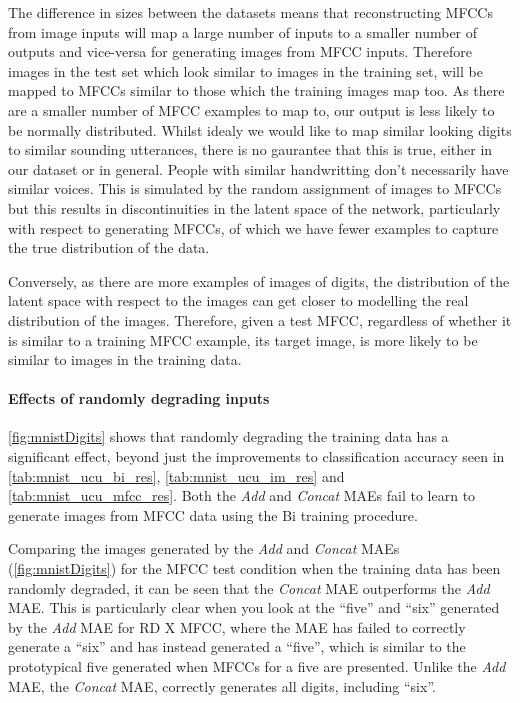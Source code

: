 The difference in sizes between the datasets means that reconstructing MFCCs from image inputs will map a large number of inputs to a smaller number of outputs and vice-versa for generating images from MFCC inputs. Therefore images in the test set which look similar to images in the training set, will be mapped to MFCCs similar to those which the training images map too. As there are a smaller number of MFCC examples to map to, our output is less likely to be normally distributed. Whilst idealy we would like to map similar looking digits to similar sounding utterances, there is no gaurantee that this is true, either in our dataset or in general. People with similar handwritting don't necessarily have similar voices. This is simulated by the random assignment of images to MFCCs but this results in discontinuities in the latent space of the network, particularly with respect to generating MFCCs, of which we have fewer examples to capture the true distribution of the data.

Conversely, as there are more examples of images of digits, the distribution of the latent space with respect to the images can get closer to modelling the real distribution of the images. Therefore, given a test MFCC, regardless of whether it is similar to a training MFCC example, its target image, is more likely to be similar to images in the training data.

\paragraph{Effects of randomly degrading inputs}
\autoref{fig:mnistDigits} shows that randomly degrading the training data has a significant effect, beyond just the improvements to classification accuracy seen in \autoref{tab:mnist_ucu_bi_res}, \autoref{tab:mnist_ucu_im_res} and \autoref{tab:mnist_ucu_mfcc_res}. Both the \textit{Add} and \textit{Concat} MAEs fail to learn to generate images from MFCC data using the Bi training procedure.

Comparing the images generated by the \textit{Add} and \textit{Concat} MAEs (\autoref{fig:mnistDigits}) for the MFCC test condition when the training data has been randomly degraded, it can be seen that the \textit{Concat} MAE outperforms the \textit{Add} MAE. This is particularly clear when you look at the ``five'' and ``six'' generated by the \textit{Add} MAE for RD X MFCC, where the MAE has failed to correctly generate a ``six'' and has instead generated a ``five'', which is similar to the prototypical five generated when MFCCs for a five are presented.
Unlike the \textit{Add} MAE, the \textit{Concat} MAE, correctly generates all digits, including ``six''.

